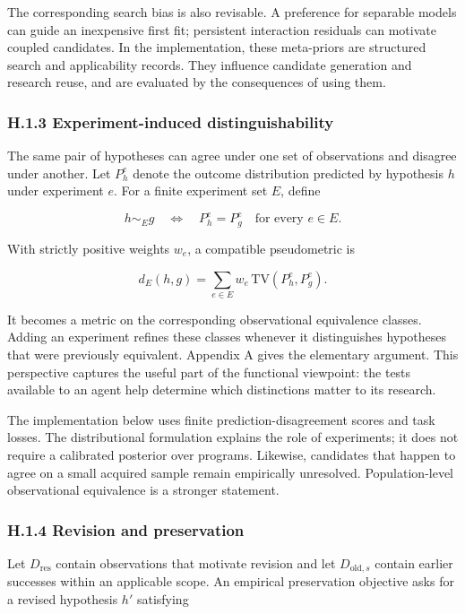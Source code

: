 \documentclass[twoside,11pt]{article}
\begin{document}
The corresponding search bias is also revisable. A preference for separable models can guide an inexpensive first fit; persistent interaction residuals can motivate coupled candidates. In the implementation, these meta-priors are structured search and applicability records. They influence candidate generation and research reuse, and are evaluated by the consequences of using them.


\subsubsection*{H.1.3 Experiment-induced distinguishability}

The same pair of hypotheses can agree under one set of observations and disagree under another. Let \(P_h^e\) denote the outcome distribution predicted by hypothesis \(h\) under experiment \(e\). For a finite experiment set \(E\), define


\[
h\sim_E g
\quad\Longleftrightarrow\quad
P_h^e=P_g^e\quad\text{for every }e\in E.
\]


With strictly positive weights \(w_e\), a compatible pseudometric is


\[
d_E(h,g)=\sum_{e\in E}w_e\,\mathrm{TV}(P_h^e,P_g^e).
\]


It becomes a metric on the corresponding observational equivalence classes. Adding an experiment refines these classes whenever it distinguishes hypotheses that were previously equivalent. Appendix A gives the elementary argument. This perspective captures the useful part of the functional viewpoint: the tests available to an agent help determine which distinctions matter to its research.


The implementation below uses finite prediction-disagreement scores and task losses. The distributional formulation explains the role of experiments; it does not require a calibrated posterior over programs. Likewise, candidates that happen to agree on a small acquired sample remain empirically unresolved. Population-level observational equivalence is a stronger statement.


\subsubsection*{H.1.4 Revision and preservation}

Let \(D_{\mathrm{res}}\) contain observations that motivate revision and let \(D_{\mathrm{old},s}\) contain earlier successes within an applicable scope. An empirical preservation objective asks for a revised hypothesis \(h'\) satisfying
\end{document}
